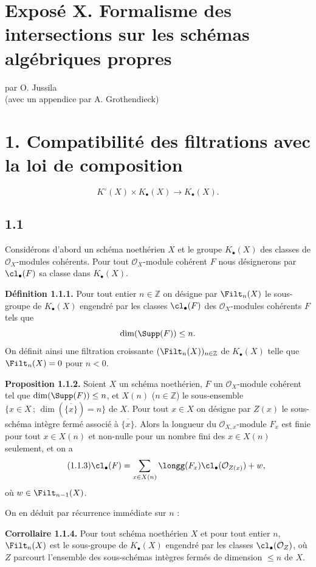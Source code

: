 \section*{Exposé X. Formalisme des intersections sur les schémas algébriques propres}
\begin{center}
par O. Jussila\\
(avec un appendice par A. Grothendieck)
\end{center}

\section*{1. Compatibilité des filtrations avec la loi de composition}
\[
K^\circ(X)\times K_\bullet(X)\longrightarrow K_\bullet(X).
\]

\subsection*{1.1}
Considérons d'abord un schéma noethérien $X$ et le groupe $K_\bullet(X)$ des classes de $\mathcal O_X$-modules cohérents. Pour tout $\mathcal O_X$-module cohérent $F$ nous désignerons par $\cl_\bullet(F)$ sa classe dans $K_\bullet(X)$.

\textbf{Définition 1.1.1.} Pour tout entier $n\in\mathbb Z$ on désigne par $\Filt_n(X)$ le sous-groupe de $K_\bullet(X)$ engendré par les classes $\cl_\bullet(F)$ des $\mathcal O_X$-modules cohérents $F$ tels que
\[
\dim(\Supp(F))\leq n.
\]
On définit ainsi une filtration croissante $(\Filt_n(X))_{n\in\mathbb Z}$ de $K_\bullet(X)$ telle que $\Filt_n(X)=0$ pour $n<0$.

\textbf{Proposition 1.1.2.} Soient $X$ un schéma noethérien, $F$ un $\mathcal O_X$-module cohérent tel que $\dim(\Supp(F))\leq n$, et $X(n)$ ($n\in\mathbb Z$) le sous-ensemble $\{x\in X\,;\,\dim(\overline{\{x\}})=n\}$ de $X$. Pour tout $x\in X$ on désigne par $Z(x)$ le sous-schéma intègre fermé associé à $\overline{\{x\}}$. Alors la longueur du $\mathcal O_{X,x}$-module $F_x$ est finie pour tout $x\in X(n)$ et non-nulle pour un nombre fini des $x\in X(n)$ seulement, et on a
\begin{equation}\tag{1.1.3}
\cl_\bullet(F)=\sum_{x\in X(n)}\longg(F_x)\cl_\bullet(\mathcal O_{Z(x)})+w,
\end{equation}
où $w\in\Filt_{n-1}(X)$.

On en déduit par récurrence immédiate sur $n$ :

\textbf{Corrollaire 1.1.4.} Pour tout schéma noethérien $X$ et pour tout entier $n$, $\Filt_n(X)$ est le sous-groupe de $K_\bullet(X)$ engendré par les classes $\cl_\bullet(\mathcal O_Z)$, où $Z$ parcourt l'ensemble des sous-schémas intègres fermés de dimension $\leq n$ de $X$.

